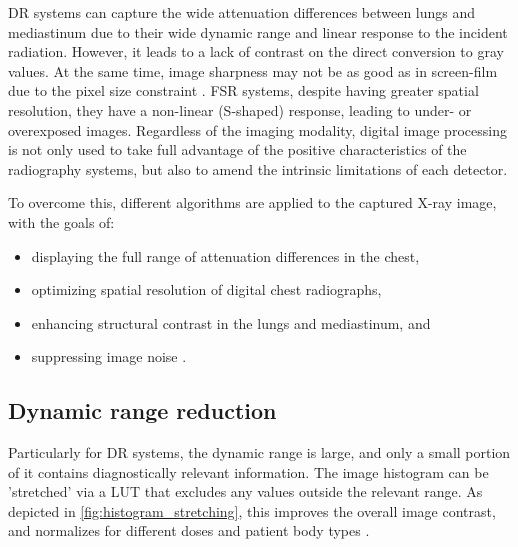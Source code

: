 \documentclass[nomenclature, english, bibtex]{kththesis}
\numberwithin{listing}{chapter}
\begin{document}
\acrfull{DR} systems can capture the wide attenuation differences between lungs and mediastinum due to
their wide dynamic range and linear response to the incident radiation. However, it leads to a lack of contrast on
the direct conversion to gray values. At the same time, image sharpness may not be as good as in screen-film
due to the pixel size constraint \cite[p.~148]{Prokop2003}. \acrfull{FSR} systems, despite having greater spatial
resolution, they have a non-linear (S-shaped) response, leading to under- or overexposed images\cite[p.~551]{vuylstekeMultiscaleImageContrast1994}.
Regardless of the imaging modality, digital image processing is not only used to take full advantage of the positive
characteristics of the radiography systems, but also to amend the intrinsic limitations of each detector.

To overcome this, different algorithms are applied to the captured X-ray image, with the goals of:

\begin{itemize}
    \item displaying the full range of attenuation differences in the chest,
    \item optimizing spatial resolution of digital chest radiographs,
    \item enhancing structural contrast in the lungs and mediastinum, and
    \item suppressing image noise \cite[p.~149]{Prokop2003}.
\end{itemize}


\subsection{Dynamic range reduction}

Particularly for \acrshort{DR} systems, the dynamic range is large, and only a small portion of it contains diagnostically
relevant information. The image histogram can be 'stretched' via a \acrfull{LUT} that excludes
any values outside the relevant range. As depicted in \autoref{fig:histogram_stretching}, this improves the overall
image contrast, and normalizes for different doses and patient body types \cite[p.~151]{Prokop2003}.
\end{document}
